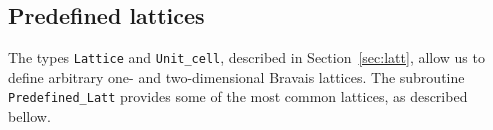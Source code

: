 %
\subsection{Predefined lattices} \label{sec:predefined_lattices}


The types \texttt{Lattice} and \texttt{Unit\_cell}, described in Section~\ref{sec:latt}, allow us to define arbitrary one- and two-dimensional Bravais lattices. The subroutine \texttt{Predefined\_Latt} provides some of the most common lattices, as described bellow.


